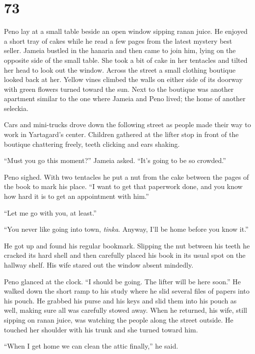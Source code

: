 
\chapter{73}

Peno lay at a small table beside an open window sipping ranan juice. He enjoyed a short tray of
cakes while he read a few pages from the latest mystery best seller. Jameia bustled in the
hanaria and then came to join him, lying on the opposite side of the small table. She took a bit
of cake in her tentacles and tilted her head to look out the window. Across the street a small
clothing boutique looked back at her. Yellow vines climbed the walls on either side of its
doorway with green flowers turned toward the sun. Next to the boutique was another apartment
similar to the one where Jameia and Peno lived; the home of another seleckia.

Cars and mini-trucks drove down the following street as people made their way to work in
Yartagard's center. Children gathered at the lifter stop in front of the boutique chattering
freely, teeth clicking and ears shaking.

``Must you go this moment?'' Jameia asked. ``It's going to be so crowded.''

Peno sighed. With two tentacles he put a nut from the cake between the pages of the book to mark
his place. ``I want to get that paperwork done, and you know how hard it is to get an
appointment with him.''

``Let me go with you, at least.''

``You never like going into town, \textit{tinka}. Anyway, I'll be home before you know it.''

He got up and found his regular bookmark. Slipping the nut between his teeth he cracked its hard
shell and then carefully placed his book in its usual spot on the hallway shelf. His wife stared
out the window absent mindedly.

Peno glanced at the clock. ``I should be going. The lifter will be here soon.'' He walked down
the short ramp to his study where he slid several files of papers into his pouch. He grabbed his
purse and his keys and slid them into his pouch as well, making sure all was carefully stowed
away. When he returned, his wife, still sipping on ranan juice, was watching the people along
the street outside. He touched her shoulder with his trunk and she turned toward him.

``When I get home we can clean the attic finally,'' he said.

